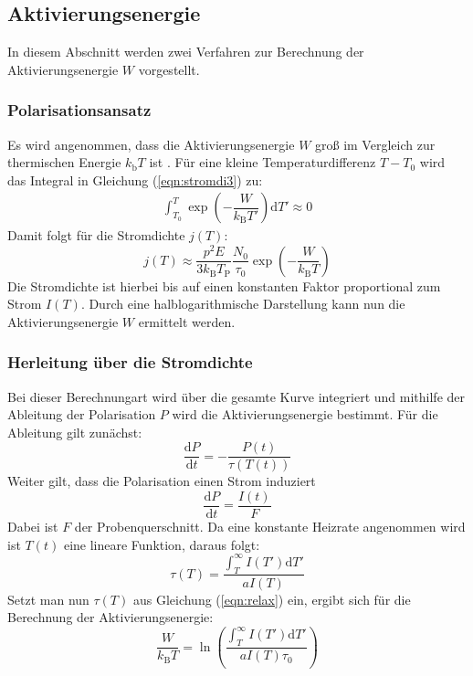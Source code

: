 \subsection{Aktivierungsenergie}
\label{sec:akti}
In diesem Abschnitt werden zwei Verfahren zur Berechnung der Aktivierungsenergie $W$ vorgestellt.
\subsubsection{Polarisationsansatz}
\label{sec:polaris}
Es wird angenommen, dass die Aktivierungsenergie $W$ groß im Vergleich zur thermischen Energie $k_\mathrm{b} T$ ist \cite[585,586]{Anleitung9}. Für eine kleine Temperaturdifferenz $T-T_\mathrm{0}$ wird das Integral in Gleichung (\ref{eqn:stromdi3}) zu:
\begin{align*}
  \int_{T_0}^T\exp{\left(-\dfrac{W}{k_\mathrm{B}T'}\right)\mathrm{d}T'}\approx0
\end{align*}
Damit folgt für die Stromdichte $j(T)$:
\begin{equation}
  \label{eqn:polarime}
  j(T)\approx \dfrac{p^2 E}{3k_\mathrm{B}T_\mathrm{P}}\dfrac{N_\mathrm{0}}{\tau_\mathrm{0}}\exp\left(-\dfrac{W}{k_\mathrm{B}T}\right)
\end{equation}
Die Stromdichte ist hierbei bis auf einen konstanten Faktor proportional zum Strom $I(T)$.
Durch eine halblogarithmische Darstellung kann nun die Aktivierungsenergie $W$ ermittelt werden.
\subsubsection{Herleitung über die Stromdichte}
\label{sec:strom1}
Bei dieser Berechnungart wird über die gesamte Kurve integriert und mithilfe der Ableitung der Polarisation $P$ wird die Aktivierungsenergie bestimmt. Für die Ableitung gilt zunächst:
\begin{equation*}
  \dfrac{\mathrm{d}P}{\mathrm{d}t}=-\dfrac{P(t)}{\tau(T(t))}
\end{equation*}
Weiter gilt, dass die Polarisation einen Strom induziert
\begin{equation*}
  \dfrac{\mathrm{d}P}{\mathrm{d}t}=\dfrac{I(t)}{F}
\end{equation*}
Dabei ist $F$ der Probenquerschnitt. Da eine konstante Heizrate angenommen wird ist $T(t)$ eine lineare Funktion, daraus folgt:
\begin{equation*}
  \tau(T) = \frac{\int_{T}^\infty I(T') \mathrm{d}T' }{ a I(T) }
\end{equation*}
Setzt man nun $\tau(T)$ aus Gleichung (\ref{eqn:relax}) ein, ergibt sich für die Berechnung der Aktivierungsenergie:
\begin{equation}
  \label{eqn:integrate}
  \dfrac{ W }{ k_\mathrm{B} T } = \ln{ \left( \frac{ \int_{T}^\infty I(T') \mathrm{d}T' }{ a I(T) \tau_\mathrm{0} } \right) }
\end{equation}
